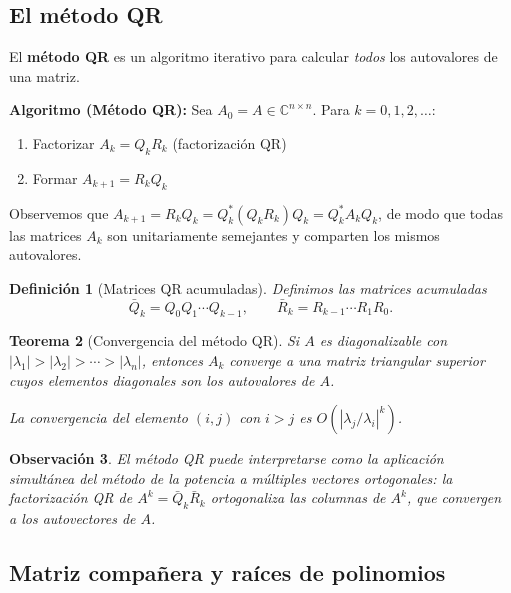 \documentclass[a4paper,11pt]{report}
\newtheorem{theorem}{Teorema}[chapter]
\newtheorem{definition}[theorem]{Definición}
\newtheorem{remark}[theorem]{Observación}
\begin{document}
\subsection{El método QR}

El \textbf{método QR} es un algoritmo iterativo para calcular \emph{todos} los autovalores de una matriz.

\textbf{Algoritmo (Método QR):}
Sea $A_0 = A \in \mathbb{C}^{n\times n}$. Para $k = 0, 1, 2, \ldots$:
\begin{enumerate}
\item Factorizar $A_k = Q_k R_k$ \quad (factorización QR)
\item Formar $A_{k+1} = R_k Q_k$
\end{enumerate}

Observemos que $A_{k+1} = R_k Q_k = Q_k^* (Q_k R_k) Q_k = Q_k^* A_k Q_k$, de modo que todas las matrices $A_k$ son unitariamente semejantes y comparten los mismos autovalores.

\begin{definition}[Matrices QR acumuladas]
Definimos las matrices acumuladas
\[
\bar{Q}_k = Q_0 Q_1 \cdots Q_{k-1}, \qquad \bar{R}_k = R_{k-1} \cdots R_1 R_0.
\]
\end{definition}

\begin{theorem}[Convergencia del método QR]\label{thm:qr_convergence}
Si $A$ es diagonalizable con $|\lambda_1| > |\lambda_2| > \cdots > |\lambda_n|$, entonces $A_k$ converge a una matriz triangular superior cuyos elementos diagonales son los autovalores de $A$.

La convergencia del elemento $(i,j)$ con $i > j$ es $O(|\lambda_j/\lambda_i|^k)$.
\end{theorem}

\begin{remark}
El método QR puede interpretarse como la aplicación simultánea del método de la potencia a múltiples vectores ortogonales: la factorización QR de $A^k = \bar{Q}_k \bar{R}_k$ ortogonaliza las columnas de $A^k$, que convergen a los autovectores de $A$.
\end{remark}


\subsection{Matriz compañera y raíces de polinomios}
\end{document}

